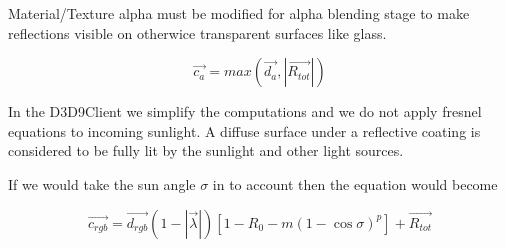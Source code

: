 \documentclass[twocolumn]{report}
\newenvironment{twocol}[0]{%
\begin{list}{}{%
\onecolumn
\setlength{\leftmargin}{0.15cm}%
\setlength{\rightmargin}{0.15cm}%
\setlength{\topmargin}{0cm}%
\setlength{\headheight}{0cm}%
\setlength{\headsep}{0cm}%
\setlength{\textheight}{24cm}%
}%
\item[]}{\end{list}}
\begin{document}
\begin{twocol}
Material/Texture alpha must be modified for alpha blending stage to make reflections visible on otherwice transparent surfaces like glass. 

\begin{equation}
\vec{c_{a}} = max(\vec{d_a}, |\vec{R_{tot}}|)
\end{equation}

In the D3D9Client we simplify the computations and we do not apply fresnel equations to incoming sunlight. A diffuse surface under a reflective coating is considered to be fully lit by the sunlight and other light sources. 

If we would take the sun angle $\sigma$ in to account then the equation would become

\begin{equation}
\vec{c_{rgb}} = \vec{d_{rgb}}(1-|\vec{\lambda}|)[1-R_0-m(1-\cos\sigma)^p] + \vec{R_{tot}}
\end{equation}

\end{twocol}
\end{document}
